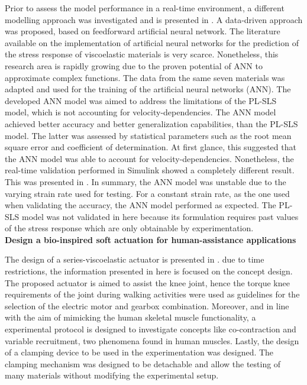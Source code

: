 Prior to assess the model performance in a real-time environment, a different modelling approach was investigated and is presented in . A data-driven approach was proposed, based on feedforward artificial neural network.  The literature available on the implementation of artificial neural networks for the prediction of the stress response of viscoelastic materials is very scarce. Nonetheless, this research area is rapidly growing due to the proven potential of ANN to approximate complex functions. The data from the same seven materials was adapted and used for the training of the artificial neural networks (ANN). The developed ANN model was aimed to address the limitations of the PL-SLS model, which is not accounting for velocity-dependencies. The ANN model achieved better accuracy and better generalization capabilities, than the PL-SLS model. The latter was assessed by statistical parameters such as the root mean square error and coefficient of determination. At first glance, this suggested that the ANN model was able to account for velocity-dependencies. Nonetheless, the real-time validation performed in Simulink showed a completely different result. This was presented in . In summary, the ANN model was unstable due to the varying strain rate used for testing. For a constant strain rate, as the one used when validating the accuracy, the ANN model performed as expected. The PL-SLS model was not validated in here because its formulation requires past values of the stress response which are only obtainable by experimentation. 
\\[1em]
\noindent \textbf{\large{ Design a bio-inspired soft actuation for human-assistance applications}}

The design of a series-viscoelastic actuator is presented in . due to time restrictions, the information presented in here is focused on the concept design. The proposed actuator is aimed to assist the knee joint, hence the torque knee requirements of the joint during walking activities were used as guidelines for the selection of the electric motor and gearbox combination. Moreover, and in line with the aim of mimicking the human skeletal muscle functionality, a experimental protocol is designed to investigate concepts like co-contraction and variable recruitment, two phenomena found in human muscles. Lastly, the design of a clamping device to be used in the experimentation was designed. The clamping mechanism was designed to be detachable and allow the testing of many materials without modifying the experimental setup.

